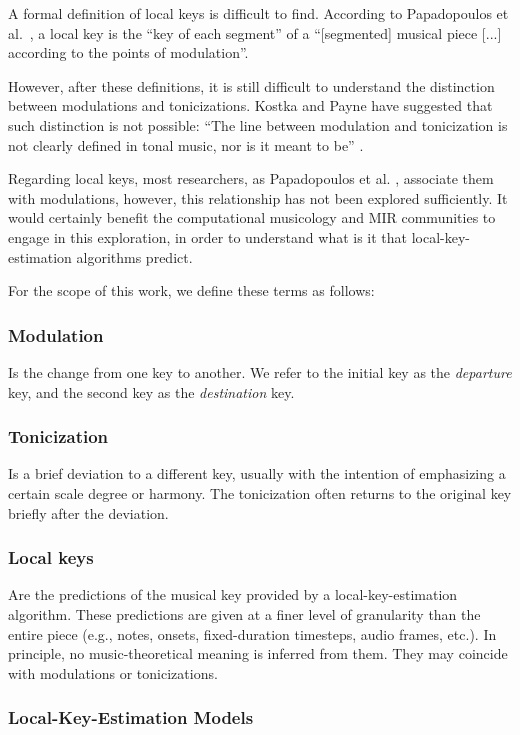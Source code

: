 A formal definition of local keys is difficult to find. According to Papadopoulos et al.~\cite{papadopoulos_local_2009}, a local key is the ``key of each segment'' of a ``[segmented] musical piece [...] according to the points of modulation''. 

However, after these definitions, it is still difficult to understand the distinction between modulations and tonicizations. Kostka and Payne have suggested that such distinction is not possible: ``The line between modulation and tonicization is not clearly defined in tonal music, nor is it meant to be'' \cite{kostka2008tonal}. 

Regarding local keys, most researchers, as Papadopoulos et al. \cite{papadopoulos_local_2009}, associate them with modulations, however, this relationship has not been explored sufficiently. It would certainly benefit the computational musicology and MIR communities to engage in this exploration, in order to understand what is it that local-key-estimation algorithms predict.

For the scope of this work, we define these terms as follows:

\subsubsection{Modulation} 
Is the change from one key to another. We refer to the initial key as the \emph{departure} key, and the second key as the \emph{destination} key.

\subsubsection{Tonicization} 
Is a brief deviation to a different key, usually with the intention of emphasizing a certain scale degree or harmony. 
The tonicization often returns to the original key briefly after the deviation.

\subsubsection{Local keys}
Are the predictions of the musical key provided by a local-key-estimation algorithm. 
These predictions are given at a finer level of granularity than the entire piece (e.g., notes, onsets, fixed-duration timesteps, audio frames, etc.).
In principle, no music-theoretical meaning is inferred from them. They may coincide with modulations or tonicizations.

\subsubsection{Local-Key-Estimation Models}\label{ssec:localkey}

